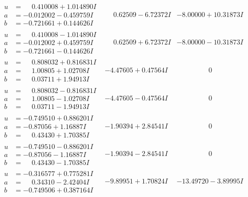 \documentclass[1p]{elsarticle_modified}
\theoremstyle{definition}
\begin{document}
$$\begin{array}{c|c|c}
\begin{aligned}
u &= \phantom{-}0.410008 + 1.014890 I \\
a &= -0.012002 - 0.459759 I \\
b &= -0.721661 + 0.144626 I\end{aligned}
 & \phantom{-}0.62509 - 6.72372 I & -8.00000 + 10.31873 I \\ \hline\begin{aligned}
u &= \phantom{-}0.410008 - 1.014890 I \\
a &= -0.012002 + 0.459759 I \\
b &= -0.721661 - 0.144626 I\end{aligned}
 & \phantom{-}0.62509 + 6.72372 I & -8.00000 - 10.31873 I \\ \hline\begin{aligned}
u &= \phantom{-}0.808032 + 0.816831 I \\
a &= \phantom{-}1.00805 + 1.02708 I \\
b &= \phantom{-}0.03711 + 1.94913 I\end{aligned}
 & -4.47605 + 0.47564 I & \phantom{-0.000000 } 0 \\ \hline\begin{aligned}
u &= \phantom{-}0.808032 - 0.816831 I \\
a &= \phantom{-}1.00805 - 1.02708 I \\
b &= \phantom{-}0.03711 - 1.94913 I\end{aligned}
 & -4.47605 - 0.47564 I & \phantom{-0.000000 } 0 \\ \hline\begin{aligned}
u &= -0.749510 + 0.886201 I \\
a &= -0.87056 + 1.16887 I \\
b &= \phantom{-}0.43430 + 1.70385 I\end{aligned}
 & -1.90394 + 2.84541 I & \phantom{-0.000000 } 0 \\ \hline\begin{aligned}
u &= -0.749510 - 0.886201 I \\
a &= -0.87056 - 1.16887 I \\
b &= \phantom{-}0.43430 - 1.70385 I\end{aligned}
 & -1.90394 - 2.84541 I & \phantom{-0.000000 } 0 \\ \hline\begin{aligned}
u &= -0.316577 + 0.775281 I \\
a &= \phantom{-}0.34310 - 2.42404 I \\
b &= -0.749506 + 0.387164 I\end{aligned}
 & -9.89951 + 1.70824 I & -13.49720 - 3.89995 I \\ \hline\begin{aligned}

\end{aligned}
\end{array}$$
\end{document}
